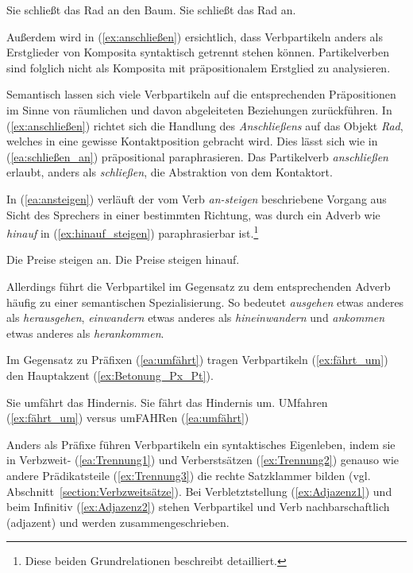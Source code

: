 \ea \label{ea:VPart_Präp}
\ea \label{ea:schließen_an} Sie schließt das Rad an den Baum.
\ex \label{ex:anschließen} Sie schließt das Rad an.
\z 
\z 

Außerdem wird in (\ref{ex:anschließen}) ersichtlich, dass Verbpartikeln anders als Erstglieder von Komposita syntaktisch getrennt stehen können. Partikelverben sind folglich nicht als Komposita mit präpositionalem Erstglied zu analysieren.

Semantisch lassen sich viele Verbpartikeln auf die entsprechenden Präpositionen im Sinne von räumlichen und davon abgeleiteten Beziehungen zurückführen. In (\ref{ex:anschließen}) richtet sich die Handlung des \textit{Anschließens} auf das Objekt \textit{Rad}, welches in eine gewisse Kontaktposition gebracht wird. Dies lässt sich wie in (\ref{ea:schließen_an}) präpositional paraphrasieren. Das Partikelverb \textit{anschließen} erlaubt, anders als \textit{schließen}, die Abstraktion von dem Kontaktort.

In (\ref{ea:ansteigen}) verläuft der vom Verb \textit{an-steigen} beschriebene Vorgang aus Sicht des Sprechers in einer bestimmten Richtung, was durch ein Adverb wie \textit{hinauf} in (\ref{ex:hinauf_steigen}) paraphrasierbar ist.\footnote{Diese beiden Grundrelationen beschreibt \citet[12--19]{Eichinger1989} detailliert.}

\ea \label{ea:an_hinauf_steigen}
\ea \label{ea:ansteigen} Die Preise steigen an.
\ex \label{ex:hinauf_steigen} Die Preise steigen hinauf.
\z 
\z 

Allerdings führt die Verbpartikel im Gegensatz zu dem entsprechenden Adverb häufig zu einer semantischen Spezialisierung. So bedeutet \textit{ausgehen} etwas anderes als \textit{herausgehen}, \textit{einwandern} etwas anderes als \textit{hineinwandern} und \textit{ankommen} etwas anderes als \textit{herankommen}.

Im Gegensatz zu Präfixen (\ref{ea:umfährt}) tragen Verbpartikeln (\ref{ex:fährt_um}) den Hauptakzent (\ref{ex:Betonung_Px_Pt}).

\ea \label{ea:um_umfahren}
\ea \label{ea:umfährt} Sie umfährt das Hindernis.
\ex \label{ex:fährt_um} Sie fährt das Hindernis um.
\ex \label{ex:Betonung_Px_Pt} UMfahren (\ref{ex:fährt_um}) versus umFAHRen (\ref{ea:umfährt})
\z 
\z 

Anders als Präfixe führen Verbpartikeln ein syntaktisches Eigenleben, indem sie in Verbzweit- (\ref{ea:Trennung1}) und Verberstsätzen (\ref{ex:Trennung2}) genauso wie andere Prädikatsteile (\ref{ex:Trennung3}) die rechte Satzklammer bilden (vgl. Abschnitt~\ref{section:Verbzweitsätze}). Bei Verbletztstellung (\ref{ex:Adjazenz1}) und beim Infinitiv (\ref{ex:Adjazenz2}) stehen Verbpartikel und Verb nachbarschaftlich (adjazent) und werden zusammengeschrieben.

